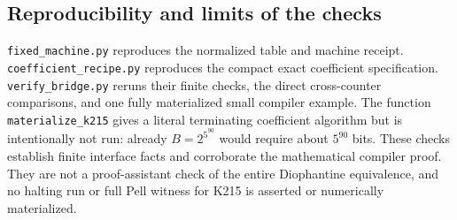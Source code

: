 \subsection{Reproducibility and limits of the checks}

\texttt{fixed\_machine.py} reproduces the normalized table and machine
receipt. \texttt{coefficient\_recipe.py} reproduces the compact exact
coefficient specification. \texttt{verify\_bridge.py} reruns their finite
checks, the direct cross-counter comparisons, and one fully materialized
small compiler example. The function \texttt{materialize\_k215} gives a
literal terminating coefficient algorithm but is intentionally not run:
already $B=2^{5^{90}}$ would require about $5^{90}$ bits.
These checks establish finite interface facts and corroborate the
mathematical compiler proof. They are not a proof-assistant check of the
entire Diophantine equivalence, and no halting run or full Pell witness
for K215 is asserted or numerically materialized.
